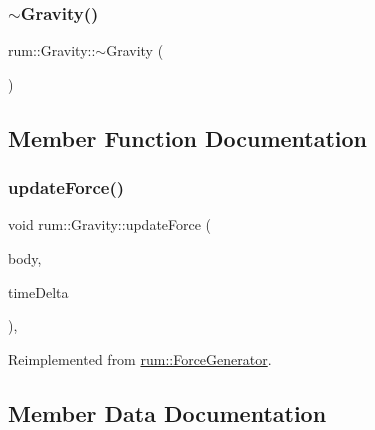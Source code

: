 \mbox{\label{classrum_1_1_gravity_a67fc63876df40007e8c7bde5e8a72569}} 
\subsubsection{\texorpdfstring{$\sim$\+Gravity()}{~Gravity()}}
{\footnotesize\ttfamily rum\+::\+Gravity\+::$\sim$\+Gravity (\begin{DoxyParamCaption}{ }\end{DoxyParamCaption})\hspace{0.3cm}{\ttfamily [default]}}



\subsection{Member Function Documentation}
\mbox{\label{classrum_1_1_gravity_abf5ce00e3e2e924a086ada82fc9d1404}} 
\subsubsection{\texorpdfstring{update\+Force()}{updateForce()}}
{\footnotesize\ttfamily void rum\+::\+Gravity\+::update\+Force (\begin{DoxyParamCaption}\item[{\mbox{\hyperlink{classrum_1_1_rigid_body}{Rigid\+Body}} $\ast$}]{body,  }\item[{\mbox{\hyperlink{namespacerum_a7e8cca23573d5eaead0f138cbaa4862c}{real}}}]{time\+Delta }\end{DoxyParamCaption})\hspace{0.3cm}{\ttfamily [override]}, {\ttfamily [virtual]}}



Reimplemented from \mbox{\hyperlink{classrum_1_1_force_generator_aee5f1dc03ba285b5122fa2a8ba790230}{rum\+::\+Force\+Generator}}.



\subsection{Member Data Documentation}
\mbox{\label{classrum_1_1_gravity_a82c9f64363024c45e96ba851a612613b}} 
